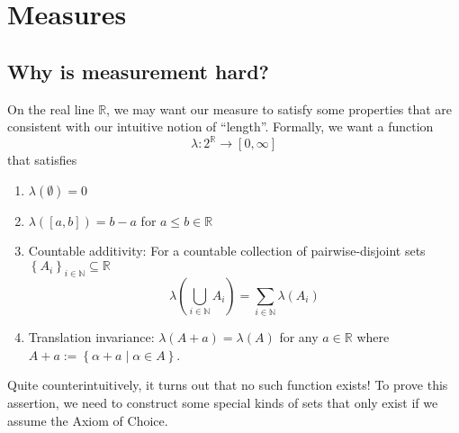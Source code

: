 
\chapter{Measures}

\section{Why is measurement hard?}

On the real line $\mathds{R}$, we may want our measure to satisfy
some properties that are consistent with our intuitive notion of ``length''.
Formally, we want a function
\[
\lambda:2^{\mathds{R}}\longrightarrow\left[0,\infty\right]
\]
that satisfies
\begin{enumerate}
\item $\lambda\left(\emptyset\right)=0$
\item $\lambda\left(\left[a,b\right]\right)=b-a$ for $a\leq b\in\mathds{R}$
\item Countable additivity: For a countable collection of pairwise-disjoint
sets $\left\{ A_{i}\right\} _{i\in\mathbb{N}}\subseteq\mathds{R}$
\begin{equation}
\lambda\left(\bigcup_{i\in\mathbb{N}}A_{i}\right)=\sum_{i\in\mathbb{N}}\lambda\left(A_{i}\right)\label{eq:countableAdditivity}
\end{equation}
\item Translation invariance: $\lambda\left(A+a\right)=\lambda\left(A\right)$
for any $a\in\mathds{R}$ where $A+a:=\left\{ \alpha+a\mid\alpha\in A\right\} $.
\end{enumerate}
Quite counterintuitively, it turns out that no such function exists!
To prove this assertion, we need to construct some special kinds of
sets that only exist if we assume the Axiom of Choice.
